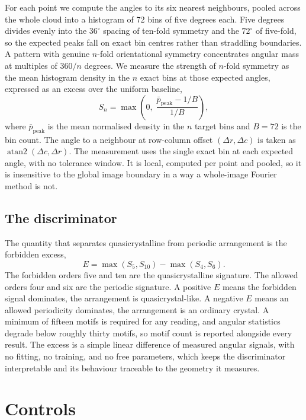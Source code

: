 \documentclass[11pt]{article}
\begin{document}
For each point we compute the angles to its six nearest neighbours, pooled
across the whole cloud into a histogram of 72 bins of five degrees each. Five
degrees divides evenly into the $36^\circ$ spacing of ten-fold symmetry and the
$72^\circ$ of five-fold, so the expected peaks fall on exact bin centres rather
than straddling boundaries. A
pattern with genuine $n$-fold orientational symmetry concentrates angular mass
at multiples of $360/n$ degrees. We measure the strength of $n$-fold symmetry as
the mean histogram density in the $n$ exact bins at those expected angles,
expressed as an excess over the uniform baseline,
\begin{equation}
S_n = \max\!\left(0,\; \frac{\bar{p}_{\text{peak}} - 1/B}{1/B}\right),
\end{equation}
where $\bar{p}_{\text{peak}}$ is the mean normalised density in the $n$ target
bins and $B = 72$ is the bin count. The angle to a neighbour at row-column
offset $(\Delta r, \Delta c)$ is taken as $\operatorname{atan2}(\Delta c, \Delta
r)$. The measurement uses the single exact bin at each expected angle, with no
tolerance window. It is local, computed per point and pooled, so it is
insensitive to the global image boundary in a way a whole-image Fourier method
is not.

\subsection{The discriminator}

The quantity that separates quasicrystalline from periodic arrangement is the
forbidden excess,
\begin{equation}
E = \max(S_5, S_{10}) - \max(S_4, S_6).
\end{equation}
The forbidden orders five and ten are the quasicrystalline signature. The
allowed orders four and six are the periodic signature. A positive $E$ means the
forbidden signal dominates, the arrangement is quasicrystal-like. A negative $E$
means an allowed periodicity dominates, the arrangement is an ordinary crystal.
A minimum of fifteen motifs is required for any reading, and angular statistics
degrade below roughly thirty motifs, so motif count is reported alongside every
result. The excess is a simple linear difference of measured angular signals,
with no fitting, no training, and no free parameters, which keeps the
discriminator interpretable and its behaviour traceable to the geometry it
measures.

\section{Controls}
\end{document}
